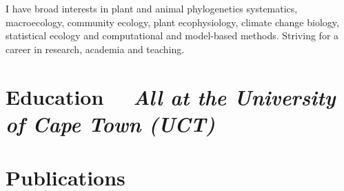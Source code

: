 \documentclass[10pt]{article}
\begin{document}


\bigskip \bigskip

I have broad interests in plant and animal phylogenetics systematics, 
macroecology, community ecology, plant ecophysiology, climate change biology, 
statistical ecology and computational and model-based methods. Striving for a 
career in research, academia and teaching.

\bigskip









\hrulefill

\section*{Education %
  ~~{\small \textmd{\textit{All at the University of Cape Town (UCT)}}}}



\section*{Publications} %


\end{document}
